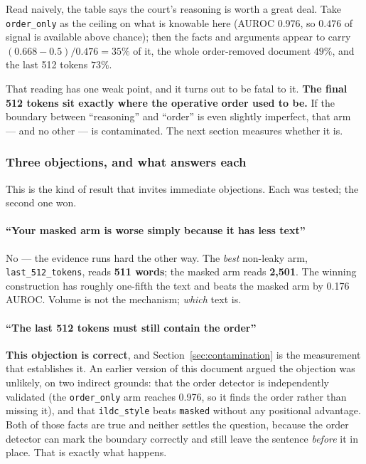\documentclass[12pt,a4paper]{article}
\newcommand{\code}[1]{\texttt{\small #1}}
\begin{document}
Read naively, the table says the court's reasoning is worth a great deal. Take \code{order\_only} as
the ceiling on what is knowable here (AUROC 0.976, so $0.476$ of signal is available above chance);
then the facts and arguments appear to carry $(0.668-0.5)/0.476 = 35\%$ of it, the whole
order-removed document $49\%$, and the last 512 tokens $73\%$.

That reading has one weak point, and it turns out to be fatal to it. \textbf{The final 512 tokens sit
exactly where the operative order used to be.} If the boundary between ``reasoning'' and ``order'' is
even slightly imperfect, that arm --- and no other --- is contaminated. The next section measures
whether it is.

\subsubsection*{Three objections, and what answers each}

This is the kind of result that invites immediate objections. Each was tested; the second one won.

\paragraph{``Your masked arm is worse simply because it has less text''} No --- the evidence runs
hard the other way. The \emph{best} non-leaky arm, \code{last\_512\_tokens}, reads \textbf{511
words}; the masked arm reads \textbf{2,501}. The winning construction has roughly one-fifth the text
and beats the masked arm by 0.176 AUROC. Volume is not the mechanism; \emph{which} text is.

\paragraph{``The last 512 tokens must still contain the order''} \textbf{This objection is correct},
and Section~\ref{sec:contamination} is the measurement that establishes it. An earlier version of
this document argued the objection was unlikely, on two indirect grounds: that the order detector is
independently validated (the \code{order\_only} arm reaches 0.976, so it finds the order rather than
missing it), and that \code{ildc\_style} beats \code{masked} without any positional advantage. Both
of those facts are true and neither settles the question, because the order detector can mark the
boundary correctly and still leave the sentence \emph{before} it in place. That is exactly what
happens.
\end{document}
